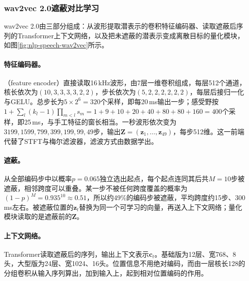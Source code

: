 \subsubsection{wav2vec 2.0遮蔽对比学习}
\label{sec:nlp-speech-wav2vec}

wav2vec 2.0由三部分组成：从波形提取潜表示的卷积特征编码器、读取遮蔽后序列的Transformer上下文网络，以及把未遮蔽的潜表示变成离散目标的量化模块，如图\ref{fig:nlp-speech-wav2vec}所示。

\paragraph{特征编码器。}（feature encoder）直接读取16\,kHz波形，由7层一维卷积组成，每层512个通道，核长依次为$(10,3,3,3,3,2,2)$，步长依次为$(5,2,2,2,2,2,2)$，每层后接归一化与GELU。总步长为$5\times2^6=320$个采样，即每20\,ms输出一步；感受野按$1+\sum_l(k_l-1)\prod_{m<l}s_m=1+9+10+20+40+80+80+160=400$个采样，即25\,ms，与手工特征的窗长相当。一秒波形依次变为$3199,1599,799,399,199,99,49$步，输出$\bm Z=(\bm z_1,\ldots,\bm z_{49})$，每步512维。这一前端代替了STFT与梅尔滤波器，滤波方式由数据学出。

\paragraph{遮蔽。}从全部编码步中以概率$p=0.065$独立选出起点，每个起点连同其后共$M=10$步被遮蔽，相邻跨度可以重叠。某一步不被任何跨度覆盖的概率为$(1-p)^M=0.935^{10}\approx0.51$，所以约49\%的编码步被遮蔽，平均跨度约15步、300\,ms左右。被遮蔽位置的$\bm z_t$替换为同一个可学习的向量，再送入上下文网络；量化模块读取的是遮蔽前的$\bm Z$。

\paragraph{上下文网络。}Transformer读取遮蔽后的序列，输出上下文表示$\bm c_t$。基础版为12层、宽768、8头，大型版为24层、宽1024、16头。位置信息不用绝对编码，而由一层核长128的分组卷积从输入序列算出，加到输入上，起到相对位置编码的作用。

